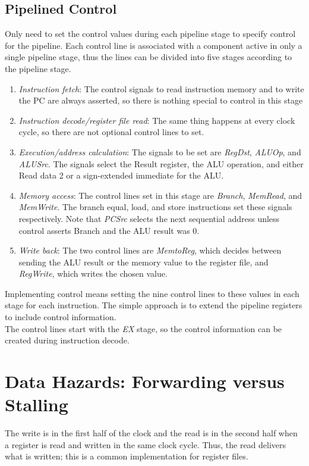 \documentclass[12pt]{article}
\theoremstyle{definition}
\begin{document}
  \subsection{Pipelined Control}
  Only need to set the control values during each pipeline stage to specify control for the pipeline.
  Each control line is associated with a component active in only a single pipeline stage, thus the lines can be divided into five stages according to the pipeline stage.
  \begin{enumerate}
    \item \emph{Instruction fetch}:
    The control signals to read instruction memory and to write the PC are always asserted, so there is nothing special to control in this stage
    \item \emph{Instruction decode/register file read}:
    The same thing happens at every clock cycle, so there are not optional control lines to set.
    \item \emph{Execution/address calculation}:
    The signals to be set are \emph{RegDst}, \emph{ALUOp}, and \emph{ALUSrc}.
    The signals select the Result register, the ALU operation, and either Read data 2 or a sign-extended immediate for the ALU.
    \item \emph{Memory access}:
    The control lines set in this stage are \emph{Branch}, \emph{MemRead}, and \emph{MemWrite}.
    The branch equal, load, and store instructions set these signals respectively.
    Note that \emph{PCSrc} selects the next sequential address unless control asserts Branch and the ALU result was 0.
    \item \emph{Write back}:
    The two control lines are \emph{MemtoReg}, which decides between sending the ALU result or the memory value to the register file, and \emph{RegWrite}, which writes the chosen value.
  \end{enumerate}
  Implementing control means setting the nine control lines to these values in each stage for each instruction.
  The simple approach is to extend the pipeline registers to include control information. \\
  The control lines start with the \emph{EX} stage, so the control information can be created during instruction decode.

  \section{Data Hazards: Forwarding versus Stalling}
  The write is in the first half of the clock and the read is in the second half when a register is read and written in the same clock cycle.
  Thus, the read delivers what is written; this is a common implementation for register files. \\
\end{document}
